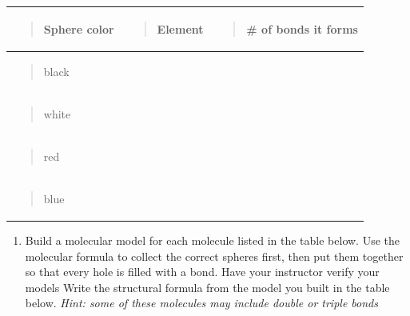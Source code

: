 \documentclass[
  letterpaper,
  DIV=11,
  numbers=noendperiod]{scrreprt}
\newcounter{none} %
\providecommand{\tightlist}{%
  \setlength{\itemsep}{0pt}\setlength{\parskip}{0pt}}
\begin{document}
{\def\LTcaptype{none} %
\begin{longtable}[]{@{}
  >{\centering\arraybackslash}p{}
  >{\raggedright\arraybackslash}p{}
  >{\raggedright\arraybackslash}p{}@{}}
\toprule\noalign{}
\begin{minipage}[b]{\linewidth}\centering
\begin{quote}
\textbf{Sphere color}
\end{quote}
\end{minipage} & \begin{minipage}[b]{\linewidth}\raggedright
\begin{quote}
\textbf{Element}
\end{quote}
\end{minipage} & \begin{minipage}[b]{\linewidth}\raggedright
\begin{quote}
\textbf{\# of bonds it forms}
\end{quote}
\end{minipage} \\
\midrule\noalign{}
\endhead
\bottomrule\noalign{}
\endlastfoot
\begin{minipage}[t]{\linewidth}\centering
\begin{quote}
black
\end{quote}
\end{minipage} & & \\
\begin{minipage}[t]{\linewidth}\centering
\begin{quote}
white
\end{quote}
\end{minipage} & & \\
\begin{minipage}[t]{\linewidth}\centering
\begin{quote}
red
\end{quote}
\end{minipage} & & \\
\begin{minipage}[t]{\linewidth}\centering
\begin{quote}
blue
\end{quote}
\end{minipage} & & \\
\end{longtable}
}

\begin{enumerate}
\def\labelenumi{\arabic{enumi}.}
\setcounter{enumi}{1}
\tightlist
\item
  Build a molecular model for each molecule listed in the table below.
  Use the molecular formula to collect the correct spheres first, then
  put them together so that every hole is filled with a bond. Have your
  instructor verify your models Write the structural formula from the
  model you built in the table below. \emph{Hint: some of these
  molecules may include double or triple bonds}
\end{enumerate}
\end{document}
